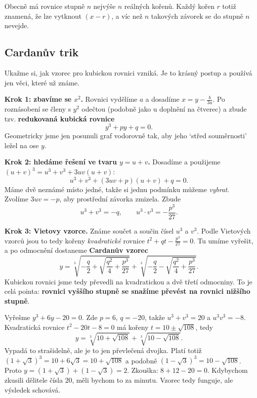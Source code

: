 Obecně má rovnice stupně $n$ nejvýše $n$ reálných kořenů. Každý kořen $r$ totiž znamená, že lze vytknout $(x - r)$, a víc než $n$ takových závorek se do stupně $n$ nevejde.

\subsection*{Cardanův trik}

Ukažme si, jak vzorec pro kubickou rovnici vzniká. Je to krásný postup a používá jen věci, které už známe.

\textbf{Krok 1: zbavíme se $x^2$.} Rovnici vydělíme $a$ a dosadíme $x = y - \frac{b}{3a}$. Po roznásobení se členy s $y^2$ odečtou (podobně jako u doplnění na čtverec) a zbude tzv. \textbf{redukovaná kubická rovnice}
\begin{equation*}
  y^3 + py + q = 0.
\end{equation*}
Geometricky jsme jen posunuli graf vodorovně tak, aby jeho `střed souměrnosti' ležel na ose $y$.

\textbf{Krok 2: hledáme řešení ve tvaru $y = u + v$.} Dosadíme a použijeme ${(u + v)}^3 = u^3 + v^3 + 3uv(u + v)$:
\begin{equation*}
  u^3 + v^3 + (3uv + p)(u + v) + q = 0.
\end{equation*}
Máme dvě neznámé místo jedné, takže si jednu podmínku můžeme \textit{vybrat}. Zvolíme $3uv = -p$, aby prostřední závorka zmizela. Zbude
\begin{equation*}
  u^3 + v^3 = -q,\qquad u^3\cdot v^3 = -\frac{p^3}{27}.
\end{equation*}

\textbf{Krok 3: Vietovy vzorce.} Známe součet a součin čísel $u^3$ a $v^3$. Podle Vietových vzorců jsou to tedy kořeny \textit{kvadratické} rovnice $t^2 + qt - \frac{p^3}{27} = 0$. Tu umíme vyřešit, a po odmocnění dostaneme \textbf{Cardanův vzorec}
\begin{equation*}
  y = \sqrt[3]{-\frac{q}{2} + \sqrt{\frac{q^2}{4} + \frac{p^3}{27}}} + \sqrt[3]{-\frac{q}{2} - \sqrt{\frac{q^2}{4} + \frac{p^3}{27}}}.
\end{equation*}
Kubickou rovnici jsme tedy převedli na kvadratickou a dvě třetí odmocniny. To je celá pointa: \textbf{rovnici vyššího stupně se snažíme převést na rovnici nižšího stupně}.

\begin{example}
  Vyřešme $y^3 + 6y - 20 = 0$. Zde $p = 6$, $q = -20$, takže $u^3 + v^3 = 20$ a $u^3v^3 = -8$. Kvadratická rovnice $t^2 - 20t - 8 = 0$ má kořeny $t = 10\pm\sqrt{108}$, tedy
  \begin{equation*}
    y = \sqrt[3]{10 + \sqrt{108}} + \sqrt[3]{10 - \sqrt{108}}.
  \end{equation*}
  Vypadá to strašidelně, ale je to jen převlečená dvojka. Platí totiž ${(1 + \sqrt{3})}^3 = 10 + 6\sqrt{3} = 10 + \sqrt{108}$ a podobně ${(1 - \sqrt{3})}^3 = 10 - \sqrt{108}$. Proto $y = (1 + \sqrt{3}) + (1 - \sqrt{3}) = 2$. Zkouška: $8 + 12 - 20 = 0$. Kdybychom zkusili dělitele čísla $20$, měli bychom to za minutu. Vzorec tedy funguje, ale výsledek schovává.
\end{example}

